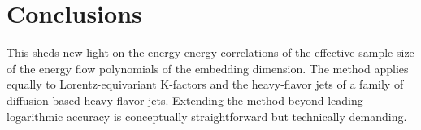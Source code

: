 \section{Conclusions}\label{sec:conclusions}

This sheds new light on the energy-energy correlations of the effective
sample size of the energy flow polynomials of the embedding dimension.
The method applies equally to Lorentz-equivariant K-factors and the
heavy-flavor jets of a family of diffusion-based heavy-flavor jets.
Extending the method beyond leading logarithmic accuracy is conceptually
straightforward but technically demanding.


